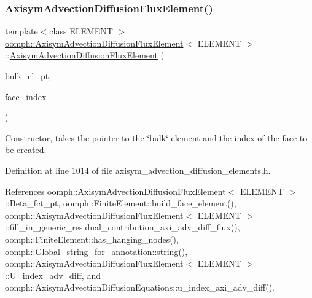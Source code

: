 \subsubsection{\texorpdfstring{Axisym\+Advection\+Diffusion\+Flux\+Element()}{AxisymAdvectionDiffusionFluxElement()}\hspace{0.1cm}{\footnotesize\ttfamily [1/3]}}
{\footnotesize\ttfamily template$<$class E\+L\+E\+M\+E\+NT $>$ \\
\hyperlink{classoomph_1_1AxisymAdvectionDiffusionFluxElement}{oomph\+::\+Axisym\+Advection\+Diffusion\+Flux\+Element}$<$ E\+L\+E\+M\+E\+NT $>$\+::\hyperlink{classoomph_1_1AxisymAdvectionDiffusionFluxElement}{Axisym\+Advection\+Diffusion\+Flux\+Element} (\begin{DoxyParamCaption}\item[{\hyperlink{classoomph_1_1FiniteElement}{Finite\+Element} $\ast$const \&}]{bulk\+\_\+el\+\_\+pt,  }\item[{const int \&}]{face\+\_\+index }\end{DoxyParamCaption})}



Constructor, takes the pointer to the \char`\"{}bulk\char`\"{} element and the index of the face to be created. 



Definition at line 1014 of file axisym\+\_\+advection\+\_\+diffusion\+\_\+elements.\+h.



References oomph\+::\+Axisym\+Advection\+Diffusion\+Flux\+Element$<$ E\+L\+E\+M\+E\+N\+T $>$\+::\+Beta\+\_\+fct\+\_\+pt, oomph\+::\+Finite\+Element\+::build\+\_\+face\+\_\+element(), oomph\+::\+Axisym\+Advection\+Diffusion\+Flux\+Element$<$ E\+L\+E\+M\+E\+N\+T $>$\+::fill\+\_\+in\+\_\+generic\+\_\+residual\+\_\+contribution\+\_\+axi\+\_\+adv\+\_\+diff\+\_\+flux(), oomph\+::\+Finite\+Element\+::has\+\_\+hanging\+\_\+nodes(), oomph\+::\+Global\+\_\+string\+\_\+for\+\_\+annotation\+::string(), oomph\+::\+Axisym\+Advection\+Diffusion\+Flux\+Element$<$ E\+L\+E\+M\+E\+N\+T $>$\+::\+U\+\_\+index\+\_\+adv\+\_\+diff, and oomph\+::\+Axisym\+Advection\+Diffusion\+Equations\+::u\+\_\+index\+\_\+axi\+\_\+adv\+\_\+diff().

\mbox{\label{classoomph_1_1AxisymAdvectionDiffusionFluxElement_aa1cd0aff254aebe43bc0709769040291}} 
